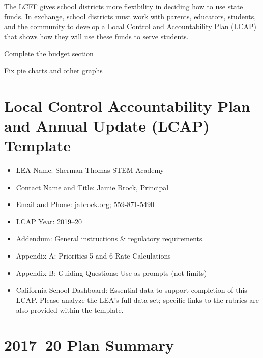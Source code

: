 \documentclass{article}
\begin{document}
The LCFF gives school districts more flexibility in deciding how to use state funds. In exchange, school districts must work with parents, educators, students, and the community to develop a Local Control and Accountability Plan (LCAP) that shows how they will use these funds to serve students.


Complete the budget section

Fix pie charts and other graphs

\newpage

\section{Local Control Accountability Plan and Annual Update (LCAP) Template}

\begin{itemize}[label={},noitemsep]
	\item LEA Name: Sherman Thomas STEM Academy
	\item Contact Name and Title: Jamie Brock, Principal
	\item Email and Phone: jabrock\@stcsca.org; 559-871-5490
	\item LCAP Year: 2019--20
\end{itemize}

\begin{itemize}[label={},noitemsep]
	\item Addendum: General instructions \& regulatory requirements.
	\item Appendix A: Priorities 5 and 6 Rate Calculations
	\item Appendix B: Guiding Questions: Use as prompts (not limits)
	\item California School Dashboard: Essential data to support completion of this LCAP. Please analyze the LEA's full data set; specific links to the rubrics are also provided within the template.
\end{itemize}

\section{2017--20 Plan Summary}
\end{document}
